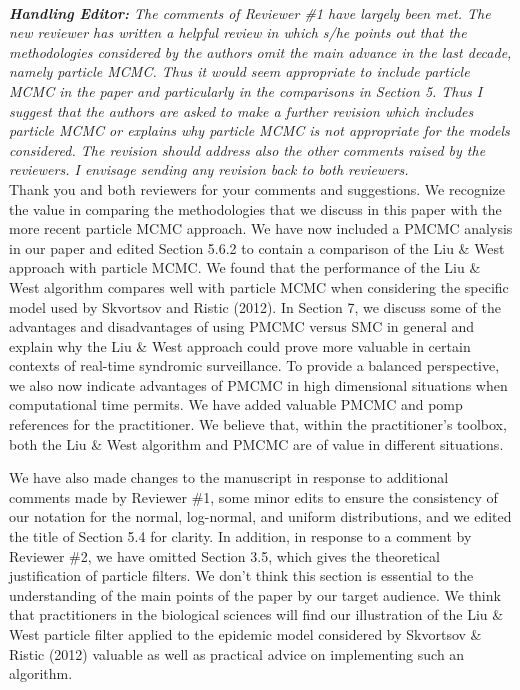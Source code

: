 \documentclass{article}
\begin{document}
 \\

\noindent \emph{{\bf Handling Editor:} The comments of Reviewer \#1 have largely been met.  The new reviewer has written a helpful review in which s/he points out that the methodologies considered by the authors omit the main advance in the last decade, namely particle MCMC.  Thus it would seem appropriate to include particle MCMC in the paper and particularly in the comparisons in Section 5.  Thus I suggest that the authors are asked to make a further revision which includes particle MCMC or explains why particle MCMC is not appropriate for the models considered.  The revision should address also the other comments raised by the reviewers.  I envisage sending any revision back to both reviewers.} \\

Thank you and both reviewers for your comments and suggestions. We recognize the value in comparing the methodologies that we discuss in this paper with the more recent particle MCMC approach. We have now included a PMCMC analysis in our paper and edited Section 5.6.2 to contain a comparison of the Liu \& West approach with particle MCMC. We found that the performance of the Liu \& West algorithm compares well with particle MCMC when considering the specific model used by Skvortsov and Ristic (2012). In Section 7, we discuss some of the advantages and disadvantages of using PMCMC versus SMC in general and explain why the Liu \& West approach could prove more valuable in certain contexts of real-time syndromic surveillance. To provide a balanced perspective, we also now indicate advantages of PMCMC in high dimensional situations when computational time permits. We have added valuable PMCMC and pomp references for the practitioner. We believe that, within the practitioner's toolbox, both the Liu \& West algorithm and PMCMC are of value in different situations.

We have also made changes to the manuscript in response to additional comments made by Reviewer \#1, some minor edits to ensure the consistency of our notation for the normal, log-normal, and uniform distributions, and we edited the title of Section 5.4 for clarity. In addition, in response to a comment by Reviewer \#2, we have omitted Section 3.5, which gives the theoretical justification of particle filters. We don't think this section is essential to the understanding of the main points of the paper by our target audience. We think that practitioners in the biological sciences will find our illustration of the Liu \& West particle filter applied to the epidemic model considered by Skvortsov \& Ristic (2012) valuable as well as practical advice on implementing such an algorithm. \\
\end{document}
